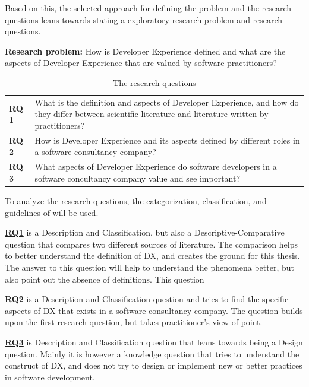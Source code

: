 \documentclass[english, 12pt, a4paper, sci, utf8, a-1b, online]{aaltothesis}
\begin{document}
Based on this, the selected approach for defining the problem and the research questions leans towards stating a exploratory research problem and research questions.

\newcommand{\researchproblem}{How is Developer Experience defined and what are the aspects of Developer Experience that are valued by software practitioners?}

\textbf{Research problem:} \researchproblem

\newcommand{\rqone}{What is the definition and aspects of Developer Experience, and how do they differ between scientific literature and literature written by practitioners?}
\newcommand{\rqtwo}{How is Developer Experience and its aspects defined by different roles in a software consultancy company?}
\newcommand{\rqthree}{What aspects of Developer Experience do software developers in a software concultancy company value and see important?}

\begin{table}[htb]
  \begin{center}
    \begin{tabularx}{\textwidth}{lX}
      \textbf{RQ 1} & \rqone \label{RQ1}   \\
      \textbf{RQ 2} & \rqtwo \label{RQ2}   \\
      \textbf{RQ 3} & \rqthree \label{RQ3}
    \end{tabularx}
  \end{center}
  \caption{The research questions \label{researchquestions}}
\end{table}

To analyze the research questions, the categorization, classification, and guidelines of \cite{easterbrook2008selecting} will be used.

\textbf{\hyperref[RQ1]{RQ1}} is a Description and Classification, but also a Descriptive-Comparative question that compares two different sources of literature. The comparison helps to better understand the definition of DX, and creates the ground for this thesis. The answer to this question will help to understand the phenomena better, but also point out the absence of definitions. This question

\textbf{\hyperref[RQ2]{RQ2}} is a Description and Classification question and tries to find the specific aspects of DX that exists in a software consultancy company. The question builds upon the first research question, but takes practitioner's view of point.

\textbf{\hyperref[RQ3]{RQ3}} is Description and Classification question that leans towards being a Design question. Mainly it is however a knowledge question that tries to understand the construct of DX, and does not try to design or implement new or better practices in software development.
\end{document}
